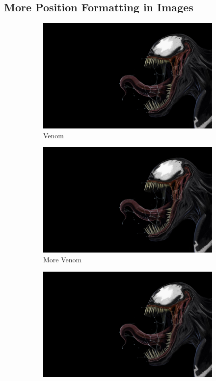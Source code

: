 \documentclass{article}
\begin{document}
\subsection{More Position Formatting in Images}
\begin{figure}[h!]
    \centering
    \begin{subfigure}[b]{0.2\linewidth}
        \includegraphics[width=\linewidth]{img.jpg}
        \caption{Venom}
    \end{subfigure}
    \begin{subfigure}[b]{0.2\linewidth}
        \includegraphics[width=\linewidth]{img.jpg}
        \caption{More Venom}
    \end{subfigure}
    \begin{subfigure}[b]{0.2\linewidth}
        \includegraphics[width=\linewidth]{img.jpg}

\end{subfigure}
\end{figure}
\end{document}
